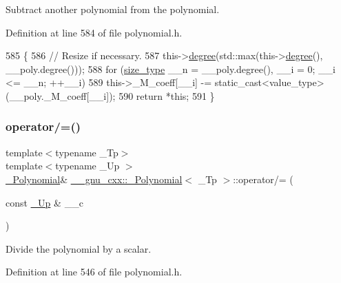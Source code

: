 Subtract another polynomial from the polynomial. 

Definition at line 584 of file polynomial.\+h.


\begin{DoxyCode}
585         \{
586           \textcolor{comment}{// Resize if necessary.}
587           this->\hyperlink{class____gnu__cxx_1_1__Polynomial_a07d9933aeeb9afbd823218ed921336cb}{degree}(std::max(this->\hyperlink{class____gnu__cxx_1_1__Polynomial_a07d9933aeeb9afbd823218ed921336cb}{degree}(), \_\_poly.degree()));
588           \textcolor{keywordflow}{for} (\hyperlink{class____gnu__cxx_1_1__Polynomial_a8b25fcfd4acaad0c5c08b649c22da28a}{size\_type} \_\_n = \_\_poly.degree(), \_\_i = 0; \_\_i <= \_\_n; ++\_\_i)
589             this->\_M\_coeff[\_\_i] -= static\_cast<value\_type>(\_\_poly.\_M\_coeff[\_\_i]);
590           \textcolor{keywordflow}{return} *\textcolor{keyword}{this};
591         \}
\end{DoxyCode}
\mbox{\label{class____gnu__cxx_1_1__Polynomial_a07401b2f492b32805170f7c0cf4c326a}} 
\subsubsection{\texorpdfstring{operator/=()}{operator/=()}\hspace{0.1cm}{\footnotesize\ttfamily [1/2]}}
{\footnotesize\ttfamily template$<$typename \+\_\+\+Tp$>$ \\
template$<$typename \+\_\+\+Up $>$ \\
\hyperlink{class____gnu__cxx_1_1__Polynomial}{\+\_\+\+Polynomial}\& \hyperlink{class____gnu__cxx_1_1__Polynomial}{\+\_\+\+\_\+gnu\+\_\+cxx\+::\+\_\+\+Polynomial}$<$ \+\_\+\+Tp $>$\+::operator/= (\begin{DoxyParamCaption}\item[{const \hyperlink{class____gnu__cxx_1_1__Polynomial_a242114d4b86648a5dff67a8221f80d40}{\+\_\+\+Up} \&}]{\+\_\+\+\_\+c }\end{DoxyParamCaption})\hspace{0.3cm}{\ttfamily [inline]}}

Divide the polynomial by a scalar. 

Definition at line 546 of file polynomial.\+h.


